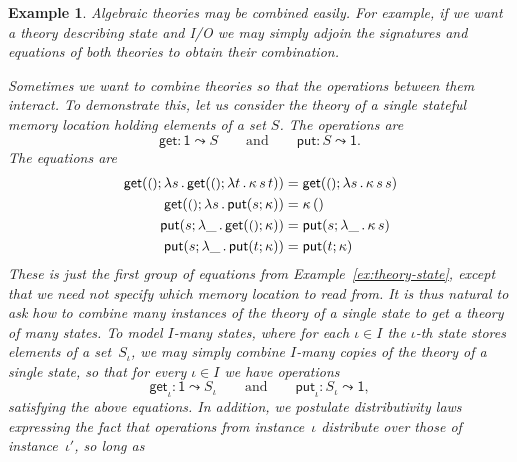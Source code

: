 \documentclass{amsart}
\newcommand{\lam}[1]{\lambda #1 \,.\,}
\newcommand{\opdecl}[3]{#1 : #2 \leadsto #3} %
\newcommand{\one}{\mathsf{1}} %
\newcommand{\unit}{{\text{\small$()$}}} %
\newcommand{\kode}[1]{\mathsf{#1}}
\newcommand{\opcall}[3]{\kode{#1}(#2; #3)}
\newtheorem{example}[definition]{Example}
\begin{document}
\begin{example}
  \label{ex:theory-single-state}
  Algebraic theories may be combined easily. For example, if we want a theory
  describing state and I/O we may simply adjoin the signatures and equations of
  both theories to obtain their combination.

  Sometimes we want to combine theories so that the operations between them
  interact. To demonstrate this, let us consider the theory of a single stateful
  memory location holding elements of a set $S$. The operations are
  \begin{equation*}
    \opdecl{\kode{get}}{\one}{S}
    \qquad\text{and}\qquad
    \opdecl{\kode{put}}{S}{\one}.
  \end{equation*}
  The equations are
  \begin{align}
    \label{eq:state-get-get}%
    \opcall{get}{\unit}{
      \lam{s}{
        \opcall{get}{\unit}{
        \lam{t} \kappa \, s \, t}
      }
    } &=
    \opcall{get}{\unit}{\lam{s}{\kappa \, s \, s}}
    \\
    \label{eq:state-get-put}%
    \opcall{get}{\unit}{
      \lam{s} \opcall{put}{s}{\kappa}
    } &=
    \kappa \, ()
    \\
    \label{eq:state-put-get}%
    \opcall{put}{s}{
      \lam{\_} \opcall{get}{\unit}{\kappa}
    } &=
    \opcall{put}{s}{\lam{\_} \kappa \, s}
    \\
    \label{eq:state-put-put}%
    \opcall{put}{s}{
      \lam{\_} \opcall{put}{t}{\kappa}
    } &=
    \opcall{put}{t}{\kappa}
  \end{align}
  These is just the first group of equations from Example~\ref{ex:theory-state},
  except that we need not specify which memory location to read from. It is thus
  natural to ask how to combine many instances of the theory of a single state
  to get a theory of many states. To model $I$-many states, where for each
  $\iota \in I$ the $\iota$-th state stores elements of a set~$S_\iota$, we may
  simply combine $I$-many copies of the theory of a single state, so that for
  every $\iota \in I$ we have operations
  \begin{equation*}
    \opdecl{\kode{get}_\iota}{\one}{S_\iota}
    \qquad\text{and}\qquad
    \opdecl{\kode{put}_\iota}{S_\iota}{\one},
  \end{equation*}
  satisfying the above equations. In addition, we postulate
  \emph{distributivity} laws expressing the fact that operations from
  instance~$\iota$ distribute over those of instance~$\iota'$, so long as

\end{example}
\end{document}
